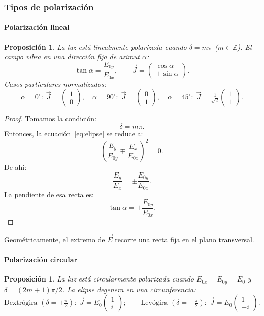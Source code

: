 \documentclass[12pt, a4paper]{article}
\theoremstyle{plain}
\newtheorem{proposicion}[teorema]{Proposición}
\theoremstyle{definition}
\theoremstyle{remark}
\newcommand{\Z}{\mathbb{Z}}
\newcommand{\ve}[1]{\vec{#1}}
\begin{document}
\subsubsection{Tipos de polarización}

\paragraph{Polarización lineal}

\begin{proposicion}
La luz está linealmente polarizada cuando $\delta = m\pi$ ($m\in\Z$).
El campo vibra en una dirección fija de azimut $\alpha$:
\begin{equation}
  \tan\alpha = \frac{E_{0y}}{E_{0x}}, \qquad
  \ve{J} = \begin{pmatrix}\cos\alpha\\\pm\sin\alpha\end{pmatrix}.
  \label{eq:jones_lineal}
\end{equation}
Casos particulares normalizados:
\[
  \alpha=0^{\circ}:\;\ve{J}=\begin{pmatrix}1\\0\end{pmatrix},\quad
  \alpha=90^{\circ}:\;\ve{J}=\begin{pmatrix}0\\1\end{pmatrix},\quad
  \alpha=45^{\circ}:\;\ve{J}=\tfrac{1}{\sqrt{2}}\begin{pmatrix}1\\1\end{pmatrix}.
\]
\end{proposicion}

\begin{proof}
Tomamos la condición:
\[
  \delta=m\pi.
\]
Entonces, la ecuación~\eqref{eq:elipse} se reduce a:
\[
  \left(\frac{E_y}{E_{0y}} \mp \frac{E_x}{E_{0x}}\right)^2 = 0.
\]
De ahí:
\[
  \frac{E_y}{E_x} = \pm\frac{E_{0y}}{E_{0x}}.
\]
La pendiente de esa recta es:
\[
  \tan\alpha=\pm\frac{E_{0y}}{E_{0x}}.
\]
\end{proof}
Geométricamente, el extremo de $\ve{E}$ recorre una recta fija en el plano
transversal.

\paragraph{Polarización circular}

\begin{proposicion}
La luz está circularmente polarizada cuando $E_{0x}=E_{0y}=E_0$ y
$\delta=(2m+1)\pi/2$. La elipse degenera en una circunferencia:
\begin{equation}
  \text{Dextrógira }(\delta=+\tfrac{\pi}{2}):\;
    \ve{J}=E_0\!\begin{pmatrix}1\\i\end{pmatrix};\qquad
  \text{Levógira }(\delta=-\tfrac{\pi}{2}):\;
    \ve{J}=E_0\!\begin{pmatrix}1\\-i\end{pmatrix}.
  \label{eq:jones_circ}
\end{equation}
\end{proposicion}
\end{document}
